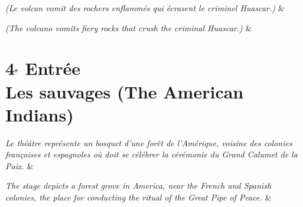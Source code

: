 \documentclass{article}
\newcommand{\accentcolr}{\color{WildStrawberry}}
\newcommand{\spotcolr}[1]{{\accentcolr#1}}
\newcommand{\secheadr}[1]{\rhead{\parbox{\marginparwidth}{\sffamily\spotcolr{#1}}}\thispagestyle{plain}}
\newcommand{\stage}[1]{\hfill\emph{(#1)}\hfill}
\newcommand{\scene}[1]{\emph{#1}\hfill}
\begin{document}
\begin{pairs}
\begin{Leftside}
	\stanza
		\stage{Le volcan vomit des rochers enflamm\'{e}s qui \'{e}crasent le criminel Huascar.}
    \& 
    \endnumbering
\end{Leftside}
\begin{Rightside}
	\stanza
		\stage{The volcano vomits fiery rocks that crush the criminal Huascar.}
    \& 
    \endnumbering
\end{Rightside} 
\Columns 
\end{pairs}

% 

\newpage

\section*{4$^{\textrm{\sffamily{e}}}$ Entr\'{e}e \\ Les sauvages (The American Indians)}\secheadr{Act 4}

\begin{pairs}
\begin{Leftside}
	\stanza
		\scene{Le th\'{e}\^{a}tre repr\'{e}sente un bosquet d'une for\^{e}t de l'Am\'{e}rique, voisine des colonies fran\c{c}aises et espagnoles o\`{u} doit se c\'{e}l\'{e}brer la c\'{e}r\'{e}monie du Grand Calumet de la Paix.}
	\& 
	\endnumbering
\end{Leftside}
\begin{Rightside}
	\stanza
		\scene{The stage depicts a forest grove in America, near the French and Spanish colonies, the place for conducting the ritual of the Great Pipe of Peace.}
	\&
	\endnumbering
\end{Rightside} 
\Columns 
\end{pairs}
\end{document}
